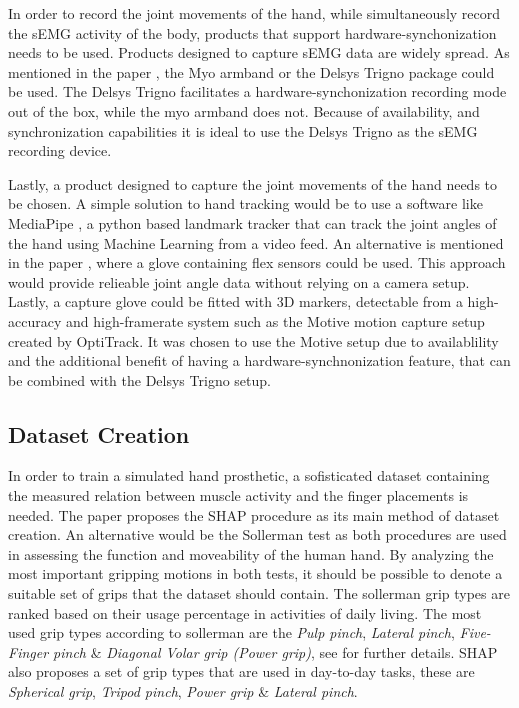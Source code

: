 \documentclass[../main.tex]{subfiles}
\begin{document}
In order to record the joint movements of the hand, while simultaneously record the sEMG activity of the body, products that support hardware-synchonization needs to be used.
Products designed to capture sEMG data are widely spread.
As mentioned in the paper \cite{Zhaolong2021}, the Myo armband \cite{myo} or the Delsys Trigno package \cite{emgworks} could be used.
The Delsys Trigno \cite{emgworks} facilitates a hardware-synchonization recording mode out of the box, while the myo armband \cite{myo} does not.
Because of availability, and synchronization capabilities it is ideal to use the Delsys Trigno as the sEMG recording device.

Lastly, a product designed to capture the joint movements of the hand needs to be chosen.
A simple solution to hand tracking would be to use a software like MediaPipe \cite{mediapipe}, a python based landmark tracker that can track the joint angles of the hand using Machine Learning from a video feed.
An alternative is mentioned in the paper \cite{Zhaolong2021}, where a glove containing flex sensors could be used.
This approach would provide relieable joint angle data without relying on a camera setup.
Lastly, a capture glove could be fitted with 3D markers, detectable from a high-accuracy and high-framerate system such as the Motive motion capture setup \cite{optitrack} created by OptiTrack.
It was chosen to use the Motive setup due to availablility and the additional benefit of having a hardware-synchnonization feature, that can be combined with the Delsys Trigno \cite{emgworks} setup.


\subsection{Dataset Creation}

In order to train a simulated hand prosthetic, a sofisticated dataset containing the measured relation between muscle activity and the finger placements is needed.
The paper \cite{KeunTaeKim2021} proposes the SHAP procedure \cite{shap} as its main method of dataset creation.
An alternative would be the Sollerman test \cite{sollerman} as both procedures are used in assessing the function and moveability of the human hand.
By analyzing the most important gripping motions in both tests, it should be possible to denote a suitable set of grips that the dataset should contain.
The sollerman grip types are ranked based on their usage percentage in activities of daily living.
The most used grip types according to sollerman are the \textit{Pulp pinch}, \textit{Lateral pinch}, \textit{Five-Finger pinch} \& \textit{Diagonal Volar grip (Power grip)}, see \cite{sollerman} for further details.
SHAP also proposes a set of grip types that are used in day-to-day tasks, these are \textit{Spherical grip}, \textit{Tripod pinch}, \textit{Power grip} \& \textit{Lateral pinch}.
\end{document}
